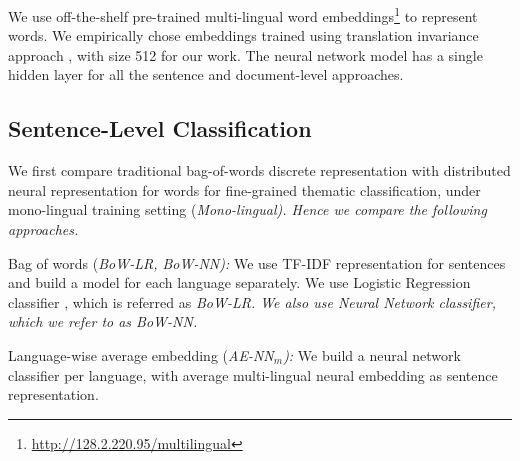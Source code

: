 \documentclass[11pt,a4paper]{article}
\newcommand{\tabref}[2][]{Table#1~\ref{#2}\xspace}
\begin{document}
We use off-the-shelf pre-trained multi-lingual word embeddings\footnote{\url{http://128.2.220.95/multilingual}} to represent words. We empirically chose embeddings trained using translation invariance approach \cite{ammar2016massively}, with size 512 for our work. The neural network model has a single hidden layer for all the sentence and document-level approaches. 
\subsection{Sentence-Level Classification}
We first compare traditional bag-of-words discrete representation with distributed neural representation for words for fine-grained thematic classification, under mono-lingual training setting (\em{Mono-lingual}). \rm Hence we compare the following approaches. 
\begin{description}
\item{Bag of words (\em{BoW-LR}, \em{BoW-NN}):} We use TF-IDF representation for sentences and build a model for each language separately. We use Logistic Regression classifier \cite{biessmann2016automating}, which is referred as \em{BoW-LR}. \rm We also use Neural Network classifier, which we refer to as \em{BoW-NN}. \rm

\item{Language-wise average embedding (\em{AE-NN$_{m}$}):} \rm We build a neural network classifier per language, with average multi-lingual neural embedding as sentence representation.
\end{description}

\end{document}
